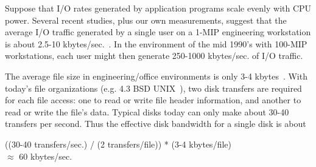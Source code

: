 % 
% 
% 
%
Suppose that I/O rates generated by application programs scale evenly
with CPU power.  Several recent studies, plus our own measurements,
suggest that the average I/O traffic generated by
a single user on a 1-MIP engineering workstation is about 2.5-10
kbytes/sec.~\cite{lazowska:file-perf,ouster:bsd}.   In the environment
of the mid 1990's with 100-MIP 
workstations, each user might then generate 250-1000 kbytes/sec. of
I/O traffic.

The average file size in engineering/office environments is
only 3-4 kbytes~\cite{ouster:bsd,satya:sizes}.  With today's file
organizations (e.g. 4.3 BSD UNIX~\cite{mckusick:unix42}), two disk
transfers are required 
for each file access:  one to read or write file header information,
and another to read or write the file's data.  Typical disks today
can only make about 30-40 transfers per second.  Thus the
effective disk bandwidth for a single disk is about
\begin{center}
((30-40 transfers/sec.) / (2 transfers/file)) * (3-4 kbytes/file) \\
 $\approx$ 60 kbytes/sec.
\end{center}

